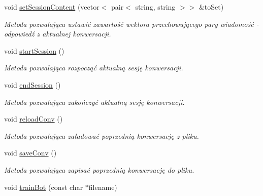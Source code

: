\begin{DoxyCompactItemize}
void \mbox{\hyperlink{class_convo_manager_af9f80e4f664a20b9042753d659d13c0e}{set\+Session\+Content}} (vector$<$ pair$<$ string, string $>$$>$ \&to\+Set)
\begin{DoxyCompactList}\small\item\em Metoda pozwalająca ustawić zawartość wektora przechowującego pary wiadomość -\/ odpowiedź z aktualnej konwersacji. \end{DoxyCompactList}\item 
\mbox{\label{class_convo_manager_ae696d5078008fafbe501b3164783480f}} 
void \mbox{\hyperlink{class_convo_manager_ae696d5078008fafbe501b3164783480f}{start\+Session}} ()
\begin{DoxyCompactList}\small\item\em Metoda pozwalająca rozpocząć aktualną sesję konwersacji. \end{DoxyCompactList}\item 
\mbox{\label{class_convo_manager_a4f8dad1234895c9731d6edd7e793b717}} 
void \mbox{\hyperlink{class_convo_manager_a4f8dad1234895c9731d6edd7e793b717}{end\+Session}} ()
\begin{DoxyCompactList}\small\item\em Metoda pozwalająca zakończyć aktualną sesję konwersacji. \end{DoxyCompactList}\item 
\mbox{\label{class_convo_manager_aeb6f9fb97e84fdb2e6f84d845167e81a}} 
void \mbox{\hyperlink{class_convo_manager_aeb6f9fb97e84fdb2e6f84d845167e81a}{reload\+Conv}} ()
\begin{DoxyCompactList}\small\item\em Metoda pozwalająca załadować poprzednią konwersację z pliku. \end{DoxyCompactList}\item 
\mbox{\label{class_convo_manager_a8a5632b74b867f48488fdd7b559e5d57}} 
void \mbox{\hyperlink{class_convo_manager_a8a5632b74b867f48488fdd7b559e5d57}{save\+Conv}} ()
\begin{DoxyCompactList}\small\item\em Metoda pozwalająca zapisać poprzednią konwersację do pliku. \end{DoxyCompactList}\item 
void \mbox{\hyperlink{class_convo_manager_aa241628ae813de8b641b227b1b5ce9f8}{train\+Bot}} (const char $\ast$filename)
$$
\end{DoxyCompactItemize}
